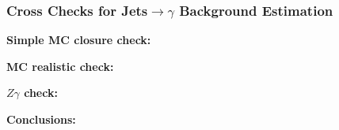 \begin{frame}\frametitle {Cross Checks for Jets$\rightarrow\gamma$ Background Estimation}

\footnotesize{\bfseries{Simple MC closure check:}}\scriptsize{}

\footnotesize{\bfseries{MC realistic check:}}\scriptsize{}

\footnotesize{\bfseries{$Z\gamma$ check:}}\scriptsize{}

\footnotesize{\bfseries{Conclusions:}}\scriptsize{}

\end{frame}%
